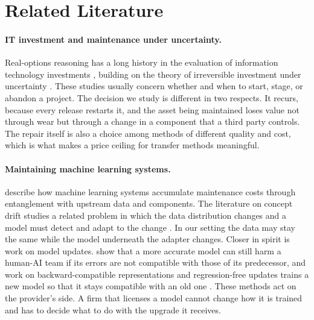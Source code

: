 \documentclass[ijds,nonblindrev]{informs4}
\begin{document}
\section{Related Literature}\label{sec:lit}

\paragraph{IT investment and maintenance under uncertainty.} Real-options reasoning has a long history in the evaluation of information technology investments \citep{benaroch1999case,benaroch2002managing}, building on the theory of irreversible investment under uncertainty \citep{mcdonald1986value,dixit1994investment}. These studies usually concern whether and when to start, stage, or abandon a project. The decision we study is different in two respects. It recurs, because every release restarts it, and the asset being maintained loses value not through wear but through a change in a component that a third party controls. The repair itself is also a choice among methods of different quality and cost, which is what makes a price ceiling for transfer methods meaningful.

\paragraph{Maintaining machine learning systems.} \citet{sculley2015hidden} describe how machine learning systems accumulate maintenance costs through entanglement with upstream data and components. The literature on concept drift studies a related problem in which the data distribution changes and a model must detect and adapt to the change \citep{gama2014survey}. In our setting the data may stay the same while the model underneath the adapter changes. Closer in spirit is work on model updates. \citet{bansal2019updates} show that a more accurate model can still harm a human-AI team if its errors are not compatible with those of its predecessor, and work on backward-compatible representations and regression-free updates trains a new model so that it stays compatible with an old one \citep{shen2020backward,yan2021positive}. These methods act on the provider's side. A firm that licenses a model cannot change how it is trained and has to decide what to do with the upgrade it receives.
\end{document}
